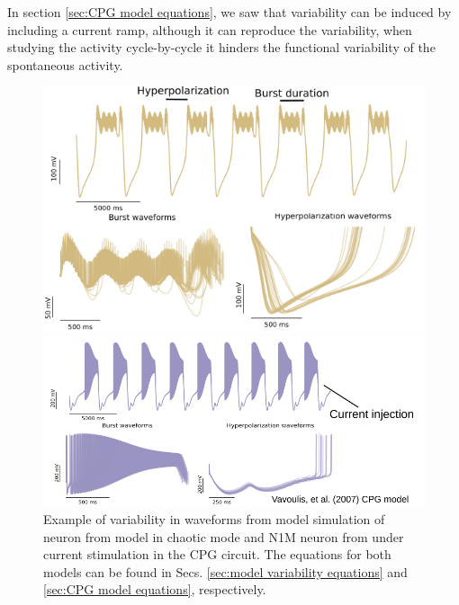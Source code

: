 In section \ref{sec:CPG model equations}, we saw that variability can be induced by including a current ramp, although it can reproduce the variability, when studying the activity cycle-by-cycle it hinders the functional variability of the spontaneous activity. 


\begin{figure}[hbt]
	\centering
	\begin{minipage}{0.48\textwidth}
		\includegraphics[width=\textwidth]{img/invariants/variability/TN-burst_variability.png}
	\end{minipage}
	\begin{minipage}{0.48\textwidth}
		\includegraphics[width=\textwidth]{img/invariants/variability/n1m_vav_burst_variability.png}
	\end{minipage}
	\caption{Example of variability in waveforms from model simulation of neuron from \textcite{nowotny_probing_2008} model in chaotic mode and N1M neuron from \textcite{vavoulis_dynamic_2007} under current stimulation in the CPG circuit. The equations for both models can be found in Secs. \ref{sec:model variability equations} and \ref{sec:CPG model equations}, respectively.}
	\label{fig:model burst variability}
\end{figure}


